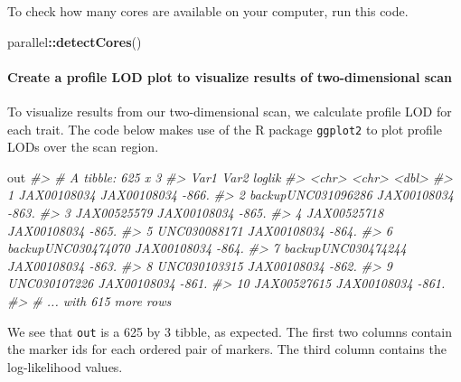 \documentclass[oneside]{book}\usepackage[]{graphicx}\usepackage[]{color}
\newenvironment{Shaded}{\begin{snugshade}}{\end{snugshade}}
\newcommand{\CommentTok}[1]{\textcolor[rgb]{0.56,0.35,0.01}{\textit{#1}}}
\newcommand{\KeywordTok}[1]{\textcolor[rgb]{0.13,0.29,0.53}{\textbf{#1}}}
\newcommand{\NormalTok}[1]{#1}
\newcommand{\OperatorTok}[1]{\textcolor[rgb]{0.81,0.36,0.00}{\textbf{#1}}}
\begin{document}
To check how many cores are available on your computer, run this code.

\begin{Shaded}
\begin{Highlighting}[]
\NormalTok{parallel}\OperatorTok{::}\KeywordTok{detectCores}\NormalTok{()}
\end{Highlighting}
\end{Shaded}

\hypertarget{create-a-profile-lod-plot-to-visualize-results-of-two-dimensional-scan}{%
\paragraph{Create a profile LOD plot to visualize results of
two-dimensional
scan}\label{create-a-profile-lod-plot-to-visualize-results-of-two-dimensional-scan}}

To visualize results from our two-dimensional scan, we calculate profile
LOD for each trait. The code below makes use of the R package
\texttt{ggplot2} to plot profile LODs over the scan region.

\begin{Shaded}
\begin{Highlighting}[]
\NormalTok{out}
\CommentTok{#> # A tibble: 625 x 3}
\CommentTok{#>    Var1               Var2        loglik}
\CommentTok{#>    <chr>              <chr>        <dbl>}
\CommentTok{#>  1 JAX00108034        JAX00108034  -866.}
\CommentTok{#>  2 backupUNC031096286 JAX00108034  -863.}
\CommentTok{#>  3 JAX00525579        JAX00108034  -865.}
\CommentTok{#>  4 JAX00525718        JAX00108034  -865.}
\CommentTok{#>  5 UNC030088171       JAX00108034  -864.}
\CommentTok{#>  6 backupUNC030474070 JAX00108034  -864.}
\CommentTok{#>  7 backupUNC030474244 JAX00108034  -863.}
\CommentTok{#>  8 UNC030103315       JAX00108034  -862.}
\CommentTok{#>  9 UNC030107226       JAX00108034  -861.}
\CommentTok{#> 10 JAX00527615        JAX00108034  -861.}
\CommentTok{#> # ... with 615 more rows}
\end{Highlighting}
\end{Shaded}

We see that \texttt{out} is a 625 by 3 tibble, as expected. The first
two columns contain the marker ids for each ordered pair of markers. The
third column contains the log-likelihood values.
\end{document}
